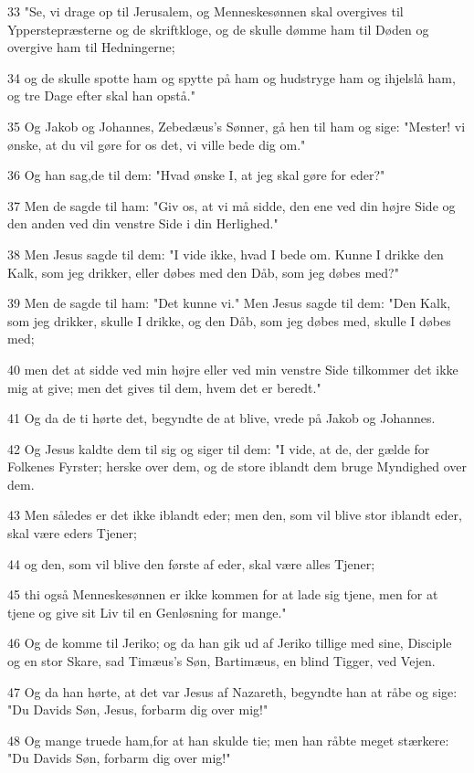 \par 33 "Se, vi drage op til Jerusalem, og Menneskesønnen skal overgives til Ypperstepræsterne og de skriftkloge, og de skulle dømme ham til Døden og overgive ham til Hedningerne;
\par 34 og de skulle spotte ham og spytte på ham og hudstryge ham og ihjelslå ham, og tre Dage efter skal han opstå."
\par 35 Og Jakob og Johannes, Zebedæus's Sønner, gå hen til ham og sige: "Mester! vi ønske, at du vil gøre for os det, vi ville bede dig om."
\par 36 Og han sag,de til dem: "Hvad ønske I, at jeg skal gøre for eder?"
\par 37 Men de sagde til ham: "Giv os, at vi må sidde, den ene ved din højre Side og den anden ved din venstre Side i din Herlighed."
\par 38 Men Jesus sagde til dem: "I vide ikke, hvad I bede om. Kunne I drikke den Kalk, som jeg drikker, eller døbes med den Dåb, som jeg døbes med?"
\par 39 Men de sagde til ham: "Det kunne vi." Men Jesus sagde til dem: "Den Kalk, som jeg drikker, skulle I drikke, og den Dåb, som jeg døbes med, skulle I døbes med;
\par 40 men det at sidde ved min højre eller ved min venstre Side tilkommer det ikke mig at give; men det gives til dem, hvem det er beredt."
\par 41 Og da de ti hørte det, begyndte de at blive, vrede på Jakob og Johannes.
\par 42 Og Jesus kaldte dem til sig og siger til dem: "I vide, at de, der gælde for Folkenes Fyrster; herske over dem, og de store iblandt dem bruge Myndighed over dem.
\par 43 Men således er det ikke iblandt eder; men den, som vil blive stor iblandt eder, skal være eders Tjener;
\par 44 og den, som vil blive den første af eder, skal være alles Tjener;
\par 45 thi også Menneskesønnen er ikke kommen for at lade sig tjene, men for at tjene og give sit Liv til en Genløsning for mange."
\par 46 Og de komme til Jeriko; og da han gik ud af Jeriko tillige med sine, Disciple og en stor Skare, sad Timæus's Søn, Bartimæus, en blind Tigger, ved Vejen.
\par 47 Og da han hørte, at det var Jesus af Nazareth, begyndte han at råbe og sige: "Du Davids Søn, Jesus, forbarm dig over mig!"
\par 48 Og mange truede ham,for at han skulde tie; men han råbte meget stærkere: "Du Davids Søn, forbarm dig over mig!"
